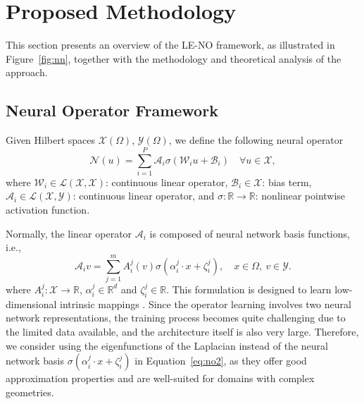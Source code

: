 \documentclass[preprint,12pt]{elsarticle}
\theoremstyle{plain}
\numberwithin{figure}{section}
\numberwithin{table}{section}
\begin{document}
\section{Proposed Methodology}
This section presents an overview of the LE-NO framework, as illustrated in Figure~\ref{fig:nn}, together with the methodology and theoretical analysis of the approach.
\subsection{Neural Operator Framework}
Given Hilbert spaces $\mathcal{X}(\Omega)$, $\mathcal{Y}(\Omega)$, we define the following neural operator
\begin{equation}\label{eq:no1}
	\mathcal{N}({u}) = \sum_{i=1}^P \mathcal{A}_i \sigma\left(\mathcal{W}_i {u} + \mathcal{B}_i\right) \quad \forall {u} \in \mathcal{X},
\end{equation}
where
$\mathcal{W}_i \in \mathcal{L}(\mathcal{X}, \mathcal{X})$: continuous linear operator,
$\mathcal{B}_i \in \mathcal{X}$: bias term, $\mathcal{A}_i \in \mathcal{L}(\mathcal{X}, \mathcal{Y})$: continuous linear operator, and $\sigma: \mathbb{R} \to \mathbb{R}$: nonlinear pointwise activation function.

Normally, the linear operator \(\mathcal{A}_i\) is composed of neural network basis functions, i.e., 
\begin{equation}\label{eq:no2}
	\mathcal{A}_iv = \sum_{j=1}^m {A}_i^j(v) \sigma(\alpha_i^j \cdot x + \zeta_i^j),\quad x\in\Omega,\ v\in\mathcal{Y}.
\end{equation}
where $A_i^j:\mathcal{X}\rightarrow\mathbb{R}$, $\alpha_i^j\in\mathbb{R}^d$ and $\zeta_i^j\in \mathbb{R}$. This formulation is designed to learn low-dimensional intrinsic mappings \cite{lu2019deeponet, li2020fourier, he2023mgno}.
Since the operator learning involves two neural network representations, the training process becomes quite challenging due to the limited data available, and the architecture itself is also very large. Therefore, we consider using the eigenfunctions of the Laplacian  instead of the neural network basis $ \sigma(\alpha_i^j \cdot x + \zeta_i^j)$ in Equation~\ref{eq:no2}, as they offer good approximation properties and are well-suited for domains with complex geometries.
\end{document}
